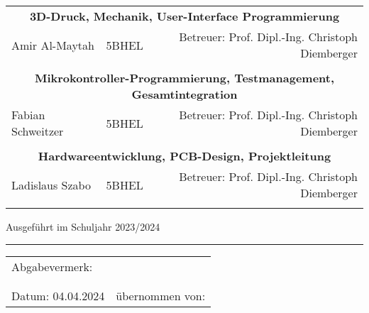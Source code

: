 \documentclass[titlepage,12pt,twoside]{article}
\begin{document}
\begin{titlepage}
	\begin{center}
		\begin{tabular}{llr} 
			\multicolumn{3}{c}{\large{\textbf{3D-Druck, Mechanik, User-Interface Programmierung}}} \\
			\large{Amir Al-Maytah} & \hspace{0.3cm}\large{5BHEL}\hspace{0.3cm} &  \large{Betreuer: Prof. Dipl.-Ing. Christoph Diemberger}\\
			\\
			\multicolumn{3}{c}{\large{\textbf{Mikrokontroller-Programmierung, Testmanagement, Gesamtintegration}}} \\
			\large{Fabian Schweitzer} & \hspace{0.3cm}\large{5BHEL}\hspace{0.3cm} &  \large{Betreuer: Prof. Dipl.-Ing. Christoph Diemberger}\\
			\\
			\multicolumn{3}{c}{\large{\textbf{Hardwareentwicklung, PCB-Design, Projektleitung}}} \\
			\large{Ladislaus Szabo} & \hspace{0.3cm}\large{5BHEL}\hspace{0.3cm} &  \large{Betreuer: Prof. Dipl.-Ing. Christoph Diemberger}\\
			\\
		\end{tabular}
	\end{center}
	
	
	
	\vspace{1.5cm}
	\normalsize
	Ausgeführt im Schuljahr 2023/2024\\
	\vspace{0.7cm}
	\noindent\rule{\textwidth}{1pt}
	\begin{tabular}{lr}
	Abgabevermerk:\\
	\\
	\\
	Datum: 04.04.2024 &\hspace{4cm}   übernommen von:\\
	\end{tabular}
	
	\end{titlepage}
	
	\newpage
	\thispagestyle{empty}
	\clearpage\mbox{}\clearpage

\end{document}
